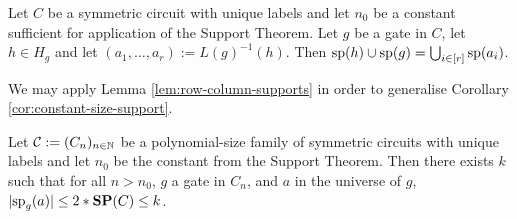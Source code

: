 \documentclass[../paper.tex]{subfiles}
\begin{document}
\begin{lem}
  Let $C$ be a symmetric circuit with unique labels and let $n_0$ be a constant
  sufficient for application of the Support Theorem. Let $g$ be a gate in $C$,
  let $h \in H_g$ and let $(a_1, \ldots, a_r) := L(g)^{-1}(h)$. Then $\text{sp}(h)
  \cup \text{sp}(g) = \bigcup_{i \in [r]} \text{sp}(a_i)$.
  \label{lem:row-column-supports}
\end{lem}

We may apply Lemma \ref{lem:row-column-supports} in order to generalise
Corollary \ref{cor:constant-size-support}.

\begin{cor}
  \label{cor:constant-size-support-for-everything}
  Let $\mathcal{C} := (C_n)_{n \in \mathbb{N}}$ be a polynomial-size family of
  symmetric circuits with unique labels and let $n_0$ be the constant from the
  Support Theorem. Then there exists $k$ such that for all $n > n_0$, $g$ a gate
  in $C_n$, and $a$ in the universe of $g$, $\vert \text{sp}_g(a) \vert \leq 2*
  \text{\textbf{SP}}(C) \leq k$.
\end{cor}






\end{document}
